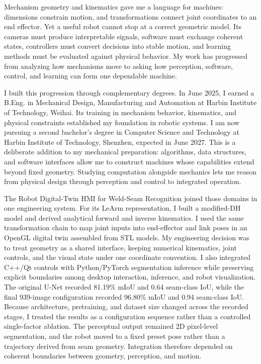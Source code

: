 Mechanism geometry and kinematics gave me a language for machines: dimensions constrain motion, and transformations connect joint coordinates to an end effector. Yet a useful robot cannot stop at a correct geometric model. Its cameras must produce interpretable signals, software must exchange coherent states, controllers must convert decisions into stable motion, and learning methods must be evaluated against physical behavior. My work has progressed from analyzing how mechanisms move to asking how perception, software, control, and learning can form one dependable machine.

I built this progression through complementary degrees. In June 2025, I earned a B.Eng. in Mechanical Design, Manufacturing and Automation at Harbin Institute of Technology, Weihai. Its training in mechanism behavior, kinematics, and physical constraints established my foundation in robotic systems. I am now pursuing a second bachelor's degree in Computer Science and Technology at Harbin Institute of Technology, Shenzhen, expected in June 2027. This is a deliberate addition to my mechanical preparation: algorithms, data structures, and software interfaces allow me to construct machines whose capabilities extend beyond fixed geometry. Studying computation alongside mechanics lets me reason from physical design through perception and control to integrated operation.

The Robot Digital-Twin HMI for Weld-Seam Recognition joined those domains in one engineering system. For its LeArm representation, I built a modified-DH model and derived analytical forward and inverse kinematics. I used the same transformation chain to map joint inputs into end-effector and link poses in an OpenGL digital twin assembled from STL models. My engineering decision was to treat geometry as a shared interface, keeping numerical kinematics, joint controls, and the visual state under one coordinate convention. I also integrated C++/Qt controls with Python/PyTorch segmentation inference while preserving explicit boundaries among desktop interaction, inference, and robot visualization. The original U-Net recorded 81.19\% mIoU and 0.64 seam-class IoU, while the final 939-image configuration recorded 96.80\% mIoU and 0.94 seam-class IoU. Because architecture, pretraining, and dataset size changed across the recorded stages, I treated the results as a configuration sequence rather than a controlled single-factor ablation. The perceptual output remained 2D pixel-level segmentation, and the robot moved to a fixed preset pose rather than a trajectory derived from seam geometry. Integration therefore depended on coherent boundaries between geometry, perception, and motion.

